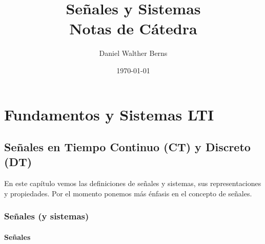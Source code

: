 \documentclass[11pt,a4paper,openany]{book}
\title{Señales y Sistemas\\ \Large Notas de Cátedra}
\author{Daniel Walther Berns}
\date{\today}
\begin{document}
	
	\maketitle
	\tableofcontents
	
	\part{Fundamentos y Sistemas LTI}
	
	
	\chapter{Señales en Tiempo Continuo (CT) y Discreto (DT)}
	

En este capítulo vemos las definiciones de señales y sistemas, sus representaciones y propiedades. Por el momento ponemos más énfasis en el concepto de señales.
	
\section{Señales (y sistemas)}

\subsection{Señales}
\end{document}
